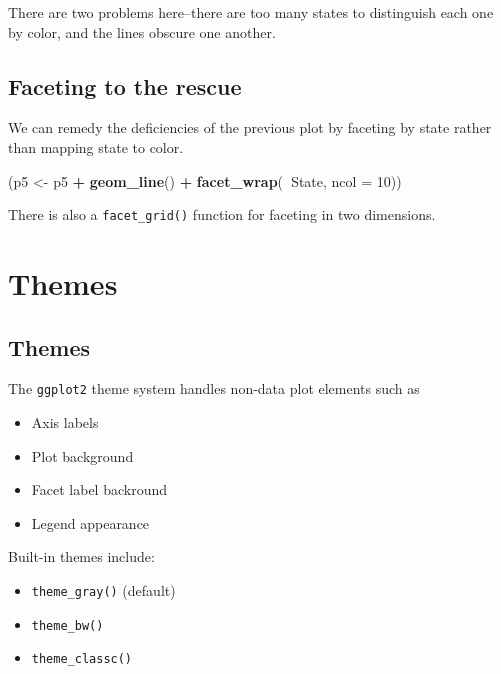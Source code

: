 \documentclass[]{book}
\newenvironment{Shaded}{\begin{snugshade}}{\end{snugshade}}
\newcommand{\KeywordTok}[1]{\textcolor[rgb]{0.13,0.29,0.53}{\textbf{#1}}}
\newcommand{\DataTypeTok}[1]{\textcolor[rgb]{0.13,0.29,0.53}{#1}}
\newcommand{\DecValTok}[1]{\textcolor[rgb]{0.00,0.00,0.81}{#1}}
\newcommand{\StringTok}[1]{\textcolor[rgb]{0.31,0.60,0.02}{#1}}
\newcommand{\OperatorTok}[1]{\textcolor[rgb]{0.81,0.36,0.00}{\textbf{#1}}}
\newcommand{\NormalTok}[1]{#1}
\providecommand{\tightlist}{%
  \setlength{\itemsep}{0pt}\setlength{\parskip}{0pt}}
\begin{document}
There are two problems here--there are too many states to distinguish
each one by color, and the lines obscure one another.

\subsection{Faceting to the rescue}\label{faceting-to-the-rescue}

We can remedy the deficiencies of the previous plot by faceting by state
rather than mapping state to color.

\begin{Shaded}
\begin{Highlighting}[]
\NormalTok{(p5 <-}\StringTok{ }\NormalTok{p5 }\OperatorTok{+}\StringTok{ }\KeywordTok{geom_line}\NormalTok{() }\OperatorTok{+}
\StringTok{   }\KeywordTok{facet_wrap}\NormalTok{(}\OperatorTok{~}\NormalTok{State, }\DataTypeTok{ncol =} \DecValTok{10}\NormalTok{))}
\end{Highlighting}
\end{Shaded}

There is also a \texttt{facet\_grid()} function for faceting in two
dimensions.

\section{Themes}\label{themes}

\subsection{Themes}\label{themes-1}

The \texttt{ggplot2} theme system handles non-data plot elements such as

\begin{itemize}
\tightlist
\item
  Axis labels
\item
  Plot background
\item
  Facet label backround
\item
  Legend appearance
\end{itemize}

Built-in themes include:

\begin{itemize}
\tightlist
\item
  \texttt{theme\_gray()} (default)
\item
  \texttt{theme\_bw()}
\item
  \texttt{theme\_classc()}
\end{itemize}
\end{document}
